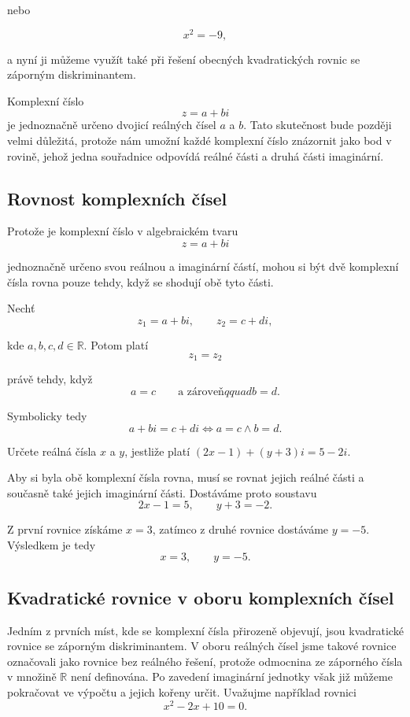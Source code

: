 \documentclass[12pt,a4paper]{article}
\begin{document}
nebo

\[
    x^2=-9,
\]

a nyní ji můžeme využít také při řešení obecných kvadratických rovnic se záporným diskriminantem.

\begin{notebox}
    Komplexní číslo
    \[
        z=a+bi
    \]
    je jednoznačně určeno dvojicí reálných čísel $a$ a $b$. 
    Tato skutečnost bude později velmi důležitá, 
    protože nám umožní každé komplexní číslo znázornit jako bod v rovině, 
    jehož jedna souřadnice odpovídá reálné části a druhá části imaginární.
\end{notebox}






\subsection{Rovnost komplexních čísel}

Protože je komplexní číslo v algebraickém tvaru
\[
    z=a+bi
\]

jednoznačně určeno svou reálnou a imaginární částí, mohou si být dvě komplexní
čísla rovna pouze tehdy, když se shodují obě tyto části.

\begin{definitionbox}
    Nechť
    \[
        z_1=a+bi, \qquad z_2=c+di,
    \]

    kde $a,b,c,d \in \mathbb{R}$. Potom platí
    \[
        z_1=z_2
    \]

    právě tehdy, když
    \[
        a=c \qquad \text{a zároveň} qquad b=d.
    \]

    Symbolicky tedy
    \[
        a+bi=c+di \Longleftrightarrow a=c \land b=d.
    \]
\end{definitionbox}

\begin{examplebox}
    Určete reálná čísla $x$ a $y$, jestliže platí $(2x-1)+(y+3)i=5-2i$.

    Aby si byla obě komplexní čísla rovna, musí se rovnat jejich reálné části
    a současně také jejich imaginární části. Dostáváme proto soustavu
    \[
        2x-1=5, \qquad y+3=-2.
    \]

    Z první rovnice získáme $x=3$, zatímco z druhé rovnice dostáváme $y=-5$.
    Výsledkem je tedy
    \[
        x=3, \qquad y=-5.
    \]
\end{examplebox}


\subsection{Kvadratické rovnice v oboru komplexních čísel}
Jedním z prvních míst, kde se komplexní čísla přirozeně objevují, 
jsou kvadratické rovnice se záporným diskriminantem. 
V oboru reálných čísel jsme takové rovnice označovali jako rovnice bez reálného řešení, 
protože odmocnina ze záporného čísla v množině $\mathbb{R}$ není definována. 
Po zavedení imaginární jednotky však již můžeme pokračovat ve výpočtu a jejich kořeny určit.
Uvažujme například rovnici
\[
    x^2-2x+10=0.
\]
\end{document}
